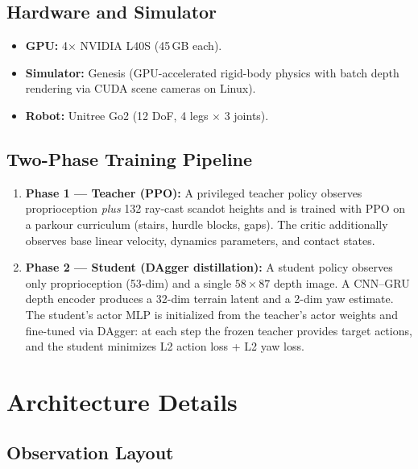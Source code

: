 \documentclass[11pt,a4paper]{article}
\begin{document}
\subsection{Hardware and Simulator}

\begin{itemize}[nosep]
  \item \textbf{GPU:} 4$\times$ NVIDIA L40S (45\,GB each).
  \item \textbf{Simulator:} Genesis (GPU-accelerated rigid-body physics with
        batch depth rendering via CUDA scene cameras on Linux).
  \item \textbf{Robot:} Unitree Go2 (12 DoF, 4 legs $\times$ 3 joints).
\end{itemize}

\subsection{Two-Phase Training Pipeline}

\begin{enumerate}[nosep]
  \item \textbf{Phase 1 --- Teacher (PPO):}
        A privileged teacher policy observes proprioception \emph{plus} 132
        ray-cast scandot heights and is trained with PPO on a parkour curriculum
        (stairs, hurdle blocks, gaps). The critic additionally observes base
        linear velocity, dynamics parameters, and contact states.
  \item \textbf{Phase 2 --- Student (DAgger distillation):}
        A student policy observes only proprioception (53-dim) and a single
        $58 \times 87$ depth image. A CNN--GRU depth encoder produces a
        32-dim terrain latent and a 2-dim yaw estimate. The student's actor MLP
        is initialized from the teacher's actor weights and fine-tuned via
        DAgger: at each step the frozen teacher provides target actions, and the
        student minimizes L2 action loss + L2 yaw loss.
\end{enumerate}

\section{Architecture Details}

\subsection{Observation Layout}
\end{document}
